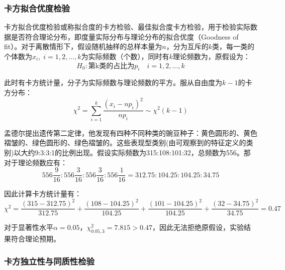 \documentclass[11pt]{article}
\begin{document}
\subsubsection*{卡方拟合优度检验}
    
卡方拟合优度检验或称拟合度的卡方检验、最佳拟合度卡方检验，用于检验实际数据是否符合理论分布，即度量实际分布与理论分布的拟合优度（Goodness of fit）。对于离散情形下，假设随机抽样的总样本量为$n$，分为互斥的$k$类，每一类的个体数为$x_i,\; i=1,2,\dots,k$为实际频数（个数），同时有$k$理论频数为，原假设为：
\begin{equation*}
    H_0: \text{第k类的占比为} p_i \quad i=1,2,\dots,k
\end{equation*}

此时有卡方统计量，分子为实际频数与理论频数的平方。服从自由度为$k-1$的卡方分布：
\begin{equation*}
    \chi^2 = \sum_{i=1}^{k} \frac{(x_i-np_i)^2}{np_i} \sim \chi^2(k-1)
\end{equation*}

\begin{example}
    孟德尔提出遗传第二定律，他发现有四种不同种类的豌豆种子：黄色圆形的、黄色褶皱的、绿色圆形的、绿色褶皱的。这些表现型类别(由可观察到的特征定义的类别)以大约9:3:3:1的比例出现。假设实际频数为315:108:101:32，总频数为556。那对于理论频数应有：
    \begin{equation*}
        556 \frac{9}{16} : 556 \frac{3}{16} : 556 \frac{3}{16} : 556 \frac{1}{16} = 312.75:104.25:104.25:34.75
    \end{equation*}

    因此计算卡方统计量有：
    \begin{equation*}
        \chi^2 = \frac{(315-312.75)^2}{312.75} + \frac{(108-104.25)^2}{104.25} + \frac{(101-104.25)^2}{104.25} + \frac{(32-34.75)^2}{34.75} = 0.47
    \end{equation*}

    对于显著性水平$\alpha=0.05$，$\chi_{0.05,3}^2 = 7.815 > 0.47$，因此无法拒绝原假设，实验结果符合理论预期。
\end{example}

\subsubsection*{卡方独立性与同质性检验}
\end{document}
